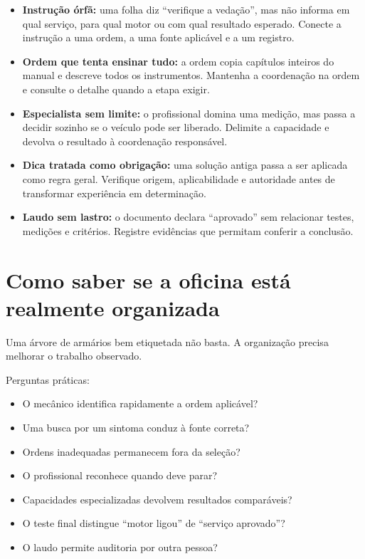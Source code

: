 \documentclass[
  10pt,
  a4paper,
  oneside]{book}
\providecommand{\tightlist}{%
  \setlength{\itemsep}{0pt}\setlength{\parskip}{0pt}}
\begin{document}
\begin{itemize}
\tightlist
\item
  \textbf{Instrução órfã:} uma folha diz ``verifique a vedação'', mas
  não informa em qual serviço, para qual motor ou com qual resultado
  esperado. Conecte a instrução a uma ordem, a uma fonte aplicável e a
  um registro.
\item
  \textbf{Ordem que tenta ensinar tudo:} a ordem copia capítulos
  inteiros do manual e descreve todos os instrumentos. Mantenha a
  coordenação na ordem e consulte o detalhe quando a etapa exigir.
\item
  \textbf{Especialista sem limite:} o profissional domina uma medição,
  mas passa a decidir sozinho se o veículo pode ser liberado. Delimite a
  capacidade e devolva o resultado à coordenação responsável.
\item
  \textbf{Dica tratada como obrigação:} uma solução antiga passa a ser
  aplicada como regra geral. Verifique origem, aplicabilidade e
  autoridade antes de transformar experiência em determinação.
\item
  \textbf{Laudo sem lastro:} o documento declara ``aprovado'' sem
  relacionar testes, medições e critérios. Registre evidências que
  permitam conferir a conclusão.
\end{itemize}

\hypertarget{como-saber-se-a-oficina-estuxe1-realmente-organizada}{%
\section{Como saber se a oficina está realmente
organizada}\label{como-saber-se-a-oficina-estuxe1-realmente-organizada}}

Uma árvore de armários bem etiquetada não basta. A organização precisa
melhorar o trabalho observado.

Perguntas práticas:

\begin{itemize}
\tightlist
\item
  O mecânico identifica rapidamente a ordem aplicável?
\item
  Uma busca por um sintoma conduz à fonte correta?
\item
  Ordens inadequadas permanecem fora da seleção?
\item
  O profissional reconhece quando deve parar?
\item
  Capacidades especializadas devolvem resultados comparáveis?
\item
  O teste final distingue ``motor ligou'' de ``serviço aprovado''?
\item
  O laudo permite auditoria por outra pessoa?
\end{itemize}
\end{document}
